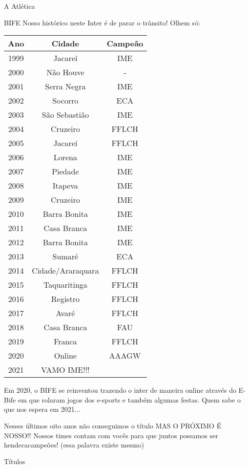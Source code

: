 \begin{secao}{A Atlética}
\begin{subsecao}{BIFE}
Nosso histórico neste Inter é de parar o trânsito! Olhem só:

\begin{center}
  \begin{tabular}{c|c|c}
   Ano & Cidade & Campeão\\
   \hline
   1999 & Jacareí & IME\\
   2000 & Não Houve & - \\
   2001 & Serra Negra & IME\\
   2002 & Socorro & ECA\\
   2003 & São Sebastião & IME\\
   2004 & Cruzeiro & FFLCH\\
   2005 & Jacareí & FFLCH\\
   2006 & Lorena & IME\\
   2007 & Piedade & IME\\
   2008 & Itapeva & IME\\
   2009 & Cruzeiro & IME\\
   2010 & Barra Bonita & IME\\
   2011 & Casa Branca & IME\\
   2012 & Barra Bonita & IME\\
   2013 & Sumaré & ECA\\
   2014 & Cidade/Araraquara & FFLCH\\
   2015 & Taquaritinga & FFLCH\\
   2016 & Registro & FFLCH\\
   2017 & Avaré & FFLCH\\
   2018 & Casa Branca & FAU\\
   2019 & Franca & FFLCH\\
   2020 & Online & AAAGW\\
   2021 & VAMO IME!!!
  \end{tabular}
\end{center}

Em 2020, o BIFE se reinventou trazendo o inter de maneira online através do
E-Bife em que rolaram jogos dos e-sports e também algumas festas. Quem sabe o
que nos espera em 2021... 

Nesses últimos oito anos não conseguimos o título MAS O PRÓXIMO É NOSSO!! Nossos 
times contam com vocês para que juntos possamos ser hendecacampeões! (essa
palavra existe mesmo)

\end{subsecao}
\pagebreak
\begin{subsecao}{Títulos}


\end{subsecao}
\end{secao}
